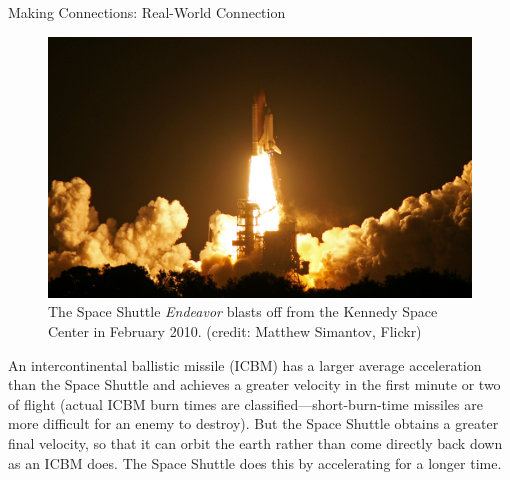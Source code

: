 \documentclass[
]{book}
\newenvironment{note}{}{}
\begin{document}
\hypertarget{fs-id1164906437247}{}
\begin{note}

Making Connections: Real-World Connection

{\hfill\break
}

\begin{figure}
\hypertarget{import-auto-id2180893}{%
\centering
\includegraphics{images/Figure_02_04_01a.jpg}
\caption{The Space Shuttle \emph{Endeavor} blasts off from the Kennedy Space Center
in February 2010. (credit: Matthew Simantov,
Flickr)}\label{import-auto-id2180893}
}
\end{figure}

An intercontinental ballistic missile (ICBM) has a larger average
acceleration than the Space Shuttle and achieves a greater velocity in
the first minute or two of flight (actual ICBM burn times are
classified---short-burn-time missiles are more difficult for an enemy to
destroy). But the Space Shuttle obtains a greater final velocity, so
that it can orbit the earth rather than come directly back down as an
ICBM does. The Space Shuttle does this by accelerating for a longer
time.

\end{note}
\end{document}
